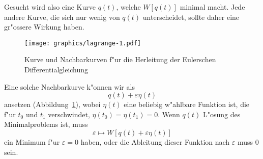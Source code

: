 Gesucht wird also eine Kurve $q(t)$, welche $W[q(t)]$ minimal macht.
Jede andere Kurve, die sich nur wenig von $q(t)$ unterscheidet, sollte
daher eine gr"ossere Wirkung haben.
\begin{figure}
\centering
\texttt{[image: graphics/lagrange-1.pdf]}
\caption{Kurve und Nachbarkurven f"ur die Herleitung der Eulerschen
Differentialgleichung
\label{skript:nachbarkurven}}
\end{figure}
Eine solche Nachbarkurve k"onnen wir als
\[
q(t) + \varepsilon \eta(t)
\]
ansetzen (Abbildung~\ref{skript:nachbarkurven}),
wobei $\eta(t)$ eine beliebig w"ahlbare Funktion ist,
die f"ur $t_0$ und $t_1$ verschwindet, $\eta(t_0)=\eta(t_1)=0$.
Wenn $q(t)$ L"osung des Minimalproblems ist, muss
\begin{equation}
\varepsilon\mapsto W[q(t)+\varepsilon\eta(t)]
\label{skript:variation-ansatz}
\end{equation}
ein Minimum f"ur $\varepsilon=0$ haben, oder die Ableitung
dieser Funktion nach $\varepsilon$ muss $0$ sein.

